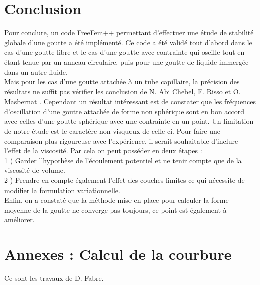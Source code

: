 \documentclass[a4paper]{report}
\begin{document}
\chapter{Conclusion}

Pour conclure, un code FreeFem++ permettant d'effectuer une étude de stabilité globale d'une goutte a été implémenté.
Ce code a été validé tout d'abord dans le cas d'une goutte libre et le cas d'une goutte avec contrainte qui oscille tout en étant tenue par un anneau circulaire,
puis pour une goutte de liquide immergée dans un autre fluide.
\\[0.25cm]
Mais pour les cas d'une goutte attachée à un tube capillaire, la précision des résultats ne suffit pas vérifier les conclusion de N. Abi Chebel, F. Risso et O. Masbernat \cite{3}.
Cependant un résultat intéressant est de constater que les fréquences d'oscillation d'une goutte attachée de forme non sphérique sont en bon accord avec celles d'une goutte sphérique avec une contrainte en un point. Un limitation de notre étude est le caractère non visqueux de celle-ci. Pour faire une comparaison plus rigoureuse avec l'expérience, il serait souhaitable d'inclure l'effet de la viscosité. Par cela on peut posséder en deux étapes : 
\\[0.25cm]
1 ) Garder l'hypothèse de l'écoulement potentiel et ne tenir compte que de la viscosité de volume.\\
2 ) Prendre en compte également l'effet des couches limites ce qui nécessite de modifier la formulation variationnelle.
\\[0.25cm]
Enfin, on a constaté que la méthode mise en place pour calculer la forme moyenne de la goutte ne converge pas toujours, ce point est également à améliorer.








\chapter{Annexes : Calcul de la courbure}
Ce sont les travaux de D. Fabre.
\end{document}
